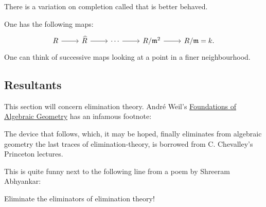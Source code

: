 \documentclass[11pt, oneside,margin=1in]{article}
\begin{document}
\begin{remark}
	There is a variation on completion called  that is better behaved.
\end{remark}

One has the following maps:
\[
\begin{tikzcd}
	R\ar[r]&\widehat{R}\ar[r] &\cdots\ar[r] & R/\mathfrak{m}^2 \ar[r]& R/\mathfrak{m} = k.
\end{tikzcd}
\]
One can think of successive maps looking at a point in a finer neighbourhood.


\subsection{Resultants}

This section will concern elimination theory. Andr\'e Weil's \underline{Foundations of Algebraic Geometry} has an infamous footnote:
\begin{center}
	\small The device that follows, which, it may be hoped, finally eliminates from algebraic geometry the last traces of elimination-theory, is borrowed from C. Chevalley's Princeton lectures.
\end{center}
This is quite funny next to the following line from a poem by Shreeram Abhyankar:
\begin{center}
	\small Eliminate the eliminators of elimination theory!
\end{center}
\end{document}
